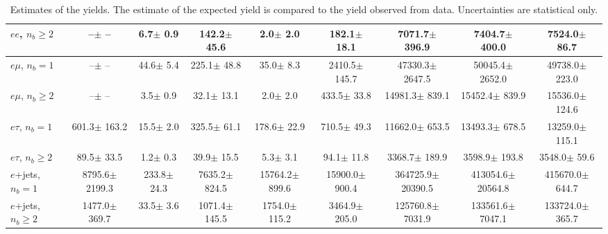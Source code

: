 \begin{sidewaystable}[p]
\begin{tabular}{l|cccccc|cc}
    $e e$, $n_b\geq2$                  &       --$\pm$     -- &      6.7$\pm$    0.9 &    142.2$\pm$   45.6 &      2.0$\pm$    2.0 &    182.1$\pm$   18.1 &   7071.7$\pm$  396.9 &   7404.7$\pm$  400.0 &   7524.0$\pm$   86.7 \\ 
    \hline
    $e\mu$, $n_b=1$                    &       --$\pm$     -- &     44.6$\pm$    5.4 &    225.1$\pm$   48.8 &     35.0$\pm$    8.3 &   2410.5$\pm$  145.7 &  47330.3$\pm$ 2647.5 &  50045.4$\pm$ 2652.0 &  49738.0$\pm$  223.0 \\ 
    $e\mu$, $n_b\geq2$                 &       --$\pm$     -- &      3.5$\pm$    0.9 &     32.1$\pm$   13.1 &      2.0$\pm$    2.0 &    433.5$\pm$   33.8 &  14981.3$\pm$  839.1 &  15452.4$\pm$  839.9 &  15536.0$\pm$  124.6 \\ 
    \hline
    $e\tau$, $n_b=1$                   &    601.3$\pm$  163.2 &     15.5$\pm$    2.0 &    325.5$\pm$   61.1 &    178.6$\pm$   22.9 &    710.5$\pm$   49.3 &  11662.0$\pm$  653.5 &  13493.3$\pm$  678.5 &  13259.0$\pm$  115.1 \\ 
    $e\tau$, $n_b\geq2$                &     89.5$\pm$   33.5 &      1.2$\pm$    0.3 &     39.9$\pm$   15.5 &      5.3$\pm$    3.1 &     94.1$\pm$   11.8 &   3368.7$\pm$  189.9 &   3598.9$\pm$  193.8 &   3548.0$\pm$   59.6 \\ 
    \hline
    $e$+jets, $n_b=1$                  &   8795.6$\pm$ 2199.3 &    233.8$\pm$   24.3 &   7635.2$\pm$  824.5 &  15764.2$\pm$  899.6 &  15900.0$\pm$  900.4 & 364725.9$\pm$20390.5 & 413054.6$\pm$20564.8 & 415670.0$\pm$  644.7 \\ 
    $e$+jets, $n_b\geq2$               &   1477.0$\pm$  369.7 &     33.5$\pm$    3.6 &   1071.4$\pm$  145.5 &   1754.0$\pm$  115.2 &   3464.9$\pm$  205.0 & 125760.8$\pm$ 7031.9 & 133561.6$\pm$ 7047.1 & 133724.0$\pm$  365.7 \\ 
    \hline

    \end{tabular}
    \caption{Estimates of the yields. The estimate of the expected yield is compared to
    the yield observed from data.  Uncertainties are statistical only.
    \label{tab:yields}}
\end{sidewaystable}
